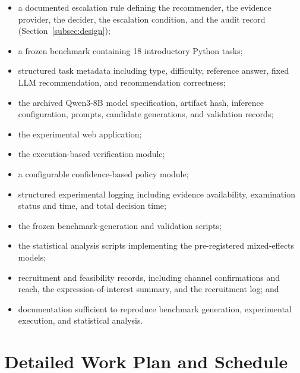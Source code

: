 \documentclass[oneside,final,14pt,a4paper]{extreport}
\begin{document}
\begin{itemize}

\item a documented escalation rule defining the recommender, the
evidence provider, the decider, the escalation condition, and the audit record
(Section~\ref{subsec:design});

\item a frozen benchmark containing 18 introductory Python tasks;

\item structured task metadata including type, difficulty, reference answer,
fixed LLM recommendation, and recommendation correctness;

\item the archived Qwen3-8B model specification, artifact hash, inference
configuration, prompts, candidate generations, and validation records;

\item the experimental web application;

\item the execution-based verification module;

\item a configurable confidence-based policy module;

\item structured experimental logging including evidence availability,
examination status and time, and total decision time;

\item the frozen benchmark-generation and validation scripts;

\item the statistical analysis scripts implementing the pre-registered
mixed-effects models;

\item recruitment and feasibility records, including channel confirmations and
reach, the expression-of-interest summary, and the recruitment log; and

\item documentation sufficient to reproduce benchmark generation,
experimental execution, and statistical analysis.

\end{itemize}


\section{Detailed Work Plan and Schedule}
\label{sec:workplan}
\end{document}
